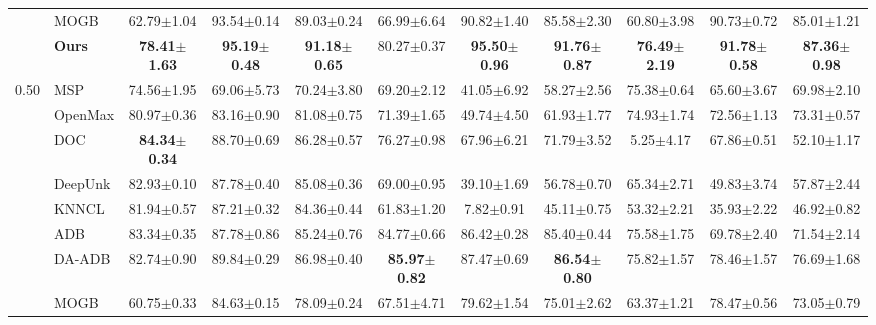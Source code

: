 \documentclass[11pt]{article}
\begin{document}
\begin{table}[!t]
\begin{tabular*}{\textwidth}{
@{\extracolsep{\fill}}
c l
ccc
ccc
ccc
@{}
}
& MOGB
& 62.79$\pm$1.04 & 93.54$\pm$0.14 & 89.03$\pm$0.24
& 66.99$\pm$6.64 & 90.82$\pm$1.40 & 85.58$\pm$2.30
& 60.80$\pm$3.98 & 90.73$\pm$0.72 & 85.01$\pm$1.21 \\

& \textbf{Ours}
& \textbf{78.41$\pm$1.63}
& \textbf{95.19$\pm$0.48}
& \textbf{91.18$\pm$0.65}
& 80.27$\pm$0.37
& \textbf{95.50$\pm$0.96}
& \textbf{91.76$\pm$0.87}
& \textbf{76.49$\pm$2.19}
& \textbf{91.78$\pm$0.58}
& \textbf{87.36$\pm$0.98} \\

\midrule

\multirow{9}{*}{0.50}
& MSP
& 74.56$\pm$1.95 & 69.06$\pm$5.73 & 70.24$\pm$3.80
& 69.20$\pm$2.12 & 41.05$\pm$6.92 & 58.27$\pm$2.56
& 75.38$\pm$0.64 & 65.60$\pm$3.67 & 69.98$\pm$2.10 \\

& OpenMax
& 80.97$\pm$0.36 & 83.16$\pm$0.90 & 81.08$\pm$0.75
& 71.39$\pm$1.65 & 49.74$\pm$4.50 & 61.93$\pm$1.77
& 74.93$\pm$1.74 & 72.56$\pm$1.13 & 73.31$\pm$0.57 \\

& DOC
& \textbf{84.34$\pm$0.34} & 88.70$\pm$0.69 & 86.28$\pm$0.57
& 76.27$\pm$0.98 & 67.96$\pm$6.21 & 71.79$\pm$3.52
& 5.25$\pm$4.17 & 67.86$\pm$0.51 & 52.10$\pm$1.17 \\

& DeepUnk
& 82.93$\pm$0.10 & 87.78$\pm$0.40 & 85.08$\pm$0.36
& 69.00$\pm$0.95 & 39.10$\pm$1.69 & 56.78$\pm$0.70
& 65.34$\pm$2.71 & 49.83$\pm$3.74 & 57.87$\pm$2.44 \\

& KNNCL
& 81.94$\pm$0.57 & 87.21$\pm$0.32 & 84.36$\pm$0.44
& 61.83$\pm$1.20 & 7.82$\pm$0.91 & 45.11$\pm$0.75
& 53.32$\pm$2.21 & 35.93$\pm$2.22 & 46.92$\pm$0.82 \\

& ADB
& 83.34$\pm$0.35 & 87.78$\pm$0.86 & 85.24$\pm$0.76
& 84.77$\pm$0.66 & 86.42$\pm$0.28 & 85.40$\pm$0.44
& 75.58$\pm$1.75 & 69.78$\pm$2.40 & 71.54$\pm$2.14 \\

& DA-ADB
& 82.74$\pm$0.90 & 89.84$\pm$0.29 & 86.98$\pm$0.40
& \textbf{85.97$\pm$0.82}
& 87.47$\pm$0.69
& \textbf{86.54$\pm$0.80}
& 75.82$\pm$1.57 & 78.46$\pm$1.57 & 76.69$\pm$1.68 \\

& MOGB
& 60.75$\pm$0.33 & 84.63$\pm$0.15 & 78.09$\pm$0.24
& 67.51$\pm$4.71 & 79.62$\pm$1.54 & 75.01$\pm$2.62
& 63.37$\pm$1.21 & 78.47$\pm$0.56 & 73.05$\pm$0.79 \\


\end{tabular*}
\end{table}
\end{document}
